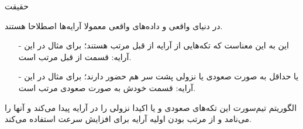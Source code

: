 \begin{frame}{حقیقت}
\begin{center}
{\large در دنیای واقعی و داده‌های واقعی معمولا آرایه‌ها اصطلاحا 
هستند.}
\end{center}
\begin{itemize}\itemr
\item[-]
این به این معناست که تکه‌هایی از آرایه از قبل مرتب هستند؛ برای مثال در این آرایه:
\m{[5, 4, 1, 2, 3]}
قسمت 
\m{[1, 2, 3]}
از قبل مرتب است.
\item[-]
یا حداقل به صورت صعودی یا نزولی پشت سر هم حضور دارند؛ برای مثال در این آرایه:
\m{[6, 4, 1, 2, 3, 5, 7]}
قسمت
\m{[1, 2, 3, 5, 7]}
خودش به صورت صعودی مرتب است.
\end{itemize}

\begin{center}
{\large الگوریتم تیم‌سورت این تکه‌های صعودی و یا اکیدا نزولی را در آرایه پیدا می‌کند و آنها را  می‌نامد و از مرتب بودن اولیه آرایه برای افزایش سرعت استفاده می‌کند.}
\end{center}
\end{frame}
